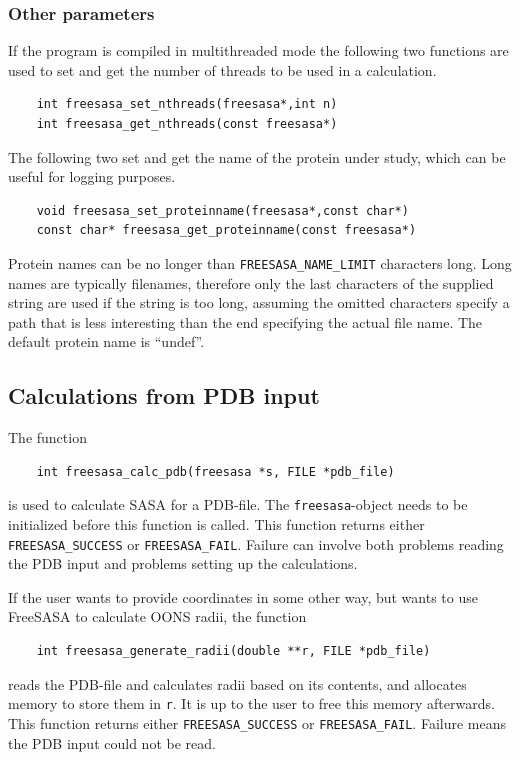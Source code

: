 \documentclass[a4paper,11pt]{article}
\begin{document}
\subsubsection{Other parameters}
If the program is compiled in multithreaded mode the following two
functions are used to set and get the number of threads to be used in
a calculation.
\begin{verbatim}
    int freesasa_set_nthreads(freesasa*,int n)
    int freesasa_get_nthreads(const freesasa*)
\end{verbatim}
The following two set and get the name of the protein under study,
which can be useful for logging purposes.
\begin{verbatim}
    void freesasa_set_proteinname(freesasa*,const char*)
    const char* freesasa_get_proteinname(const freesasa*)
\end{verbatim}
Protein names can be no longer than \verb|FREESASA_NAME_LIMIT|
characters long. Long names are typically filenames, therefore only
the last characters of the supplied string are used if the string is
too long, assuming the omitted characters specify a path that is less
interesting than the end specifying the actual file name. The default
protein name is ``undef''.

\subsection{Calculations from PDB input}

The function 
\begin{verbatim}
    int freesasa_calc_pdb(freesasa *s, FILE *pdb_file)
\end{verbatim}
is used to calculate SASA for a PDB-file. The
\verb|freesasa|-object needs to be initialized before this
function is called. This function returns either
\verb|FREESASA_SUCCESS| or \verb|FREESASA_FAIL|. Failure can
involve both problems reading the PDB input and problems setting up
the calculations.

If the user wants to provide coordinates in some other way, but wants to
use FreeSASA to calculate OONS radii, the function
\begin{verbatim}
    int freesasa_generate_radii(double **r, FILE *pdb_file)
\end{verbatim}
reads the PDB-file and calculates radii based on its contents, and
allocates memory to store them in \texttt{r}. It is up to the user to
free this memory afterwards. This function returns either
\verb|FREESASA_SUCCESS| or \verb|FREESASA_FAIL|. Failure means the
PDB input could not be read.
\end{document}
